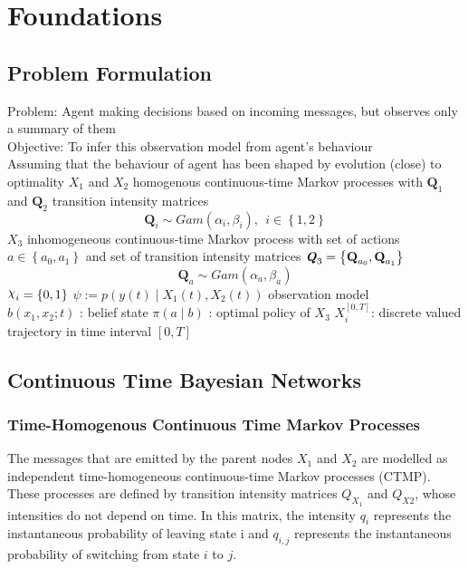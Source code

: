 \DeclareRobustCommand{\rchi}{{\mathpalette\irchi\relax}}
\newcommand{\irchi}[2]{\raisebox{\depth}{$#1\chi$}}

\chapter{Foundations}

\section{Problem Formulation}
\begin{wrapfigure}{r}{5.5cm}
	\caption{A wrapped figure going nicely inside the text.}\label{wrap-fig:1}
	\texttt{[image: figure/h\_model]}}
\end{wrapfigure} 
Problem: Agent making decisions based on incoming messages, but observes only a summary of them \\
Objective: To infer this observation model from agent's behaviour \\
Assuming that the behaviour of agent has been shaped by evolution (close) to optimality
$ X_{1} $ and $ X_{2} $ homogenous continuous-time Markov processes with $ \textbf{Q}_{1} $ and $ \textbf{Q}_{2} $ transition intensity matrices
\begin{equation}
\textbf{Q}_{i} \sim Gam(\alpha_{i}, \beta_{i}),\ \ i \in \left\lbrace 1,2\right\rbrace 
\end{equation}
$X_{3} $ inhomogeneous continuous-time Markov process  with set of actions $ a \in \left\lbrace a_{0}, a_{1}\right\rbrace  $ and set of transition intensity matrices $ \textbf{\textit{Q}}_{3} = \left\lbrace \textbf{Q}_{a_{0}}, \textbf{Q}_{a_{1}} \right\rbrace  $
\begin{equation}
\textbf{Q}_{a} \sim Gam(\alpha_{a}, \beta_{a})
\end{equation}
$ \rchi_{i} = \left\lbrace 0,1\right\rbrace  $
$ \psi  := p(y(t) \mid X_{1}(t), X_{2}(t)) $ observation model\\
$  b(x_{1}, x_{2}; t) $ : belief state
$ \pi(a \mid b) $ : optimal policy of $ X_{3} $
 $ X_{i}^{[0,T]} $: discrete valued trajectory in time interval $ [0, T] $

\section{Continuous Time Bayesian Networks}

\subsection{Time-Homogenous Continuous Time Markov Processes}
The messages that are emitted by the parent nodes $X_{1}$ and $ X_{2} $ are modelled as independent time-homogeneous continuous-time Markov processes (CTMP). These processes are defined by transition intensity matrices $ Q_{X_{1}} $ and $ Q_{X{2}} $, whose intensities do not depend on time. In this matrix, the intensity $ q_{i} $ represents the instantaneous probability of leaving state i and $ q_{i,j} $ represents the instantaneous probability of switching from state $ i $ to $ j $. %

